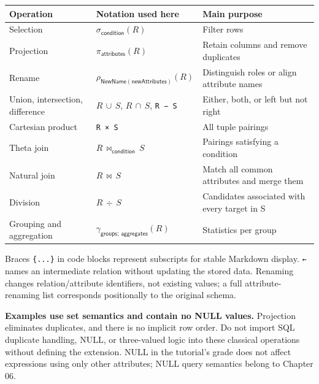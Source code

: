 \begin{longtable}[]{@{}
  >{\raggedright\arraybackslash}p{}
  >{\raggedright\arraybackslash}p{}
  >{\raggedright\arraybackslash}p{}@{}}
\toprule\noalign{}
\begin{minipage}[b]{\linewidth}\raggedright
Operation
\end{minipage} & \begin{minipage}[b]{\linewidth}\raggedright
Notation used here
\end{minipage} & \begin{minipage}[b]{\linewidth}\raggedright
Main purpose
\end{minipage} \\
\midrule\noalign{}
\endhead
\bottomrule\noalign{}
\endlastfoot
Selection & \(\sigma _{\mathsf{condition}}(R)\) & Filter rows \\
Projection & \(\pi _{\mathsf{attributes}}(R)\) & Retain columns and remove duplicates \\
Rename & \(\rho _{\mathsf{NewName}(\mathsf{newAttributes})}(R)\) & Distinguish roles or align attribute names \\
Union, intersection, difference & \(R\,\cup \,S\), \(R\,\cap \,S\), \texttt{R\ −\ S} & Either, both, or left but not right \\
Cartesian product & \texttt{R\ ×\ S} & All tuple pairings \\
Theta join & \(R\,\bowtie _{\mathsf{condition}}\,S\) & Pairings satisfying a condition \\
Natural join & \(R\,\bowtie \,S\) & Match all common attributes and merge them \\
Division & \(R\,\div \,S\) & Candidates associated with every target in S \\
Grouping and aggregation & \(\gamma _{\mathsf{groups};\,\mathsf{aggregates}}(R)\) & Statistics per group \\
\end{longtable}

Braces \texttt{\{...\}} in code blocks represent subscripts for stable Markdown display. \texttt{←} names an intermediate relation without updating the stored data. Renaming changes relation/attribute identifiers, not existing values; a full attribute-renaming list corresponds positionally to the original schema.

\textbf{Examples use set semantics and contain no NULL values.} Projection eliminates duplicates, and there is no implicit row order. Do not import SQL duplicate handling, NULL, or three-valued logic into these classical operations without defining the extension. NULL in the tutorial's grade does not affect expressions using only other attributes; NULL query semantics belong to Chapter 06.

